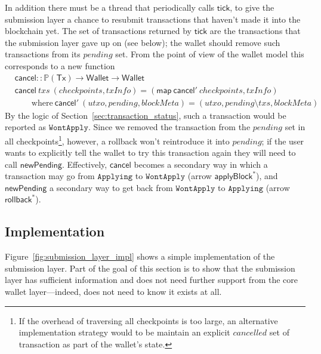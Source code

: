 \documentclass{article}
\numberwithin{equation}{lemma}
\begin{document}
In addition there must be a thread that periodically calls $\mathsf{tick}$, to
give the submission layer a chance to resubmit transactions that haven't made it
into the blockchain yet. The set of transactions returned by $\mathsf{tick}$ are
the transactions that the submission layer gave up on (see below); the wallet
should remove such transactions from its $\mathit{pending}$ set. From the point
of view of the wallet model this corresponds to a new function
%
\begin{align*}
& \mathsf{cancel} :: \mathbb{P}(\mathsf{Tx}) \rightarrow \mathsf{Wallet} \rightarrow \mathsf{Wallet} \\
& \mathsf{cancel} ~ \mathit{txs} ~ (\mathit{checkpoints}, \mathit{txInfo}) = (\mathsf{map} ~ \mathsf{cancel'} ~ \mathit{checkpoints}, \mathit{txInfo}) \\
& \qquad \text{where} ~ \mathsf{cancel}' ~ (\mathit{utxo}, \mathit{pending}, \mathit{blockMeta}) = (\mathit{utxo}, \mathit{pending} \setminus \mathit{txs}, \mathit{blockMeta})
\end{align*}
%
By the logic of Section~\ref{sec:transaction_status}, such a transaction would
be reported as $\mathtt{WontApply}$. Since we removed the transaction from the
$\mathit{pending}$ set in all checkpoints\footnote{If the overhead of traversing
all checkpoints is too large, an alternative implementation strategy would to be
maintain an explicit $\mathit{cancelled}$ set of transaction as part of the
wallet's state.}, however, a rollback won't reintroduce it into
$\mathit{pending}$; if the user wants to explicitly tell the wallet to try this
transaction again they will need to call $\mathsf{newPending}$. Effectively,
$\mathsf{cancel}$ becomes a secondary way in which a transaction may go from
$\texttt{Applying}$ to $\texttt{WontApply}$ (arrow $\mathsf{applyBlock}^*$), and
$\mathsf{newPending}$ a secondary way to get back from $\texttt{WontApply}$ to
$\texttt{Applying}$ (arrow $\mathsf{rollback}^*$).

\subsection{Implementation}
\label{sec:submission_implementation}

Figure~\ref{fig:submission_layer_impl} shows a simple implementation of the
submission layer.  Part of the goal of this section is to show that the
submission layer has sufficient information and does not need further support
from the core wallet layer---indeed, does not need to know it exists at all.
\end{document}

